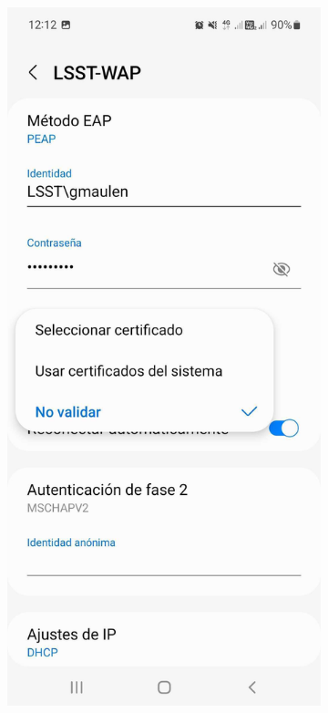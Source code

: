   \begin{figure}
    \centering
    \begin{subfigure}{0.30\textwidth}
      \includegraphics[width=\textwidth]{Images/Android3.jpg}

\end{subfigure}
\end{figure}

